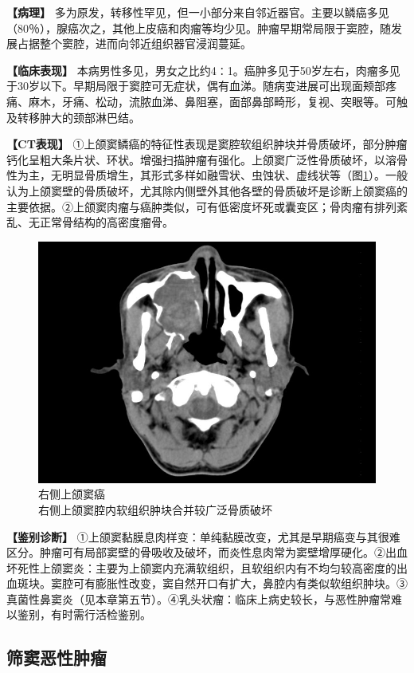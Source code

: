 \textbf{【病理】}
多为原发，转移性罕见，但一小部分来自邻近器官。主要以鳞癌多见（80％），腺癌次之，其他上皮癌和肉瘤等均少见。肿瘤早期常局限于窦腔，随发展占据整个窦腔，进而向邻近组织器官浸润蔓延。

\textbf{【临床表现】}
本病男性多见，男女之比约4∶1。癌肿多见于50岁左右，肉瘤多见于30岁以下。早期局限于窦腔可无症状，偶有血涕。随病变进展可出现面颊部疼痛、麻木，牙痛、松动，流脓血涕、鼻阻塞，面部鼻部畸形，复视、突眼等。可触及转移肿大的颈部淋巴结。

\textbf{【CT表现】}
①上颌窦鳞癌的特征性表现是窦腔软组织肿块并骨质破坏，部分肿瘤钙化呈粗大条片状、环状。增强扫描肿瘤有强化。上颌窦广泛性骨质破坏，以溶骨性为主，无明显骨质增生，其形式多样如融雪状、虫蚀状、虚线状等（图\ref{fig5-10}）。一般认为上颌窦壁的骨质破坏，尤其除内侧壁外其他各壁的骨质破坏是诊断上颌窦癌的主要依据。②上颌窦肉瘤与癌肿类似，可有低密度坏死或囊变区；骨肉瘤有排列紊乱、无正常骨结构的高密度瘤骨。

\begin{figure}[!htbp]
 \centering
 \includegraphics[width=.7\textwidth,height=\textheight,keepaspectratio]{./images/Image00132.jpg}
 \captionsetup{justification=centering}
 \caption{右侧上颌窦癌\\{\small 右侧上颌窦腔内软组织肿块合并较广泛骨质破坏}}
 \label{fig5-10}
  \end{figure} 

\textbf{【鉴别诊断】}
①上颌窦黏膜息肉样变：单纯黏膜改变，尤其是早期癌变与其很难区分。肿瘤可有局部窦壁的骨吸收及破坏，而炎性息肉常为窦壁增厚硬化。②出血坏死性上颌窦炎：主要为上颌窦内充满软组织，且软组织内有不均匀较高密度的出血斑块。窦腔可有膨胀性改变，窦自然开口有扩大，鼻腔内有类似软组织肿块。③真菌性鼻窦炎（见本章第五节）。④乳头状瘤：临床上病史较长，与恶性肿瘤常难以鉴别，有时需行活检鉴别。

\subsection{筛窦恶性肿瘤}

